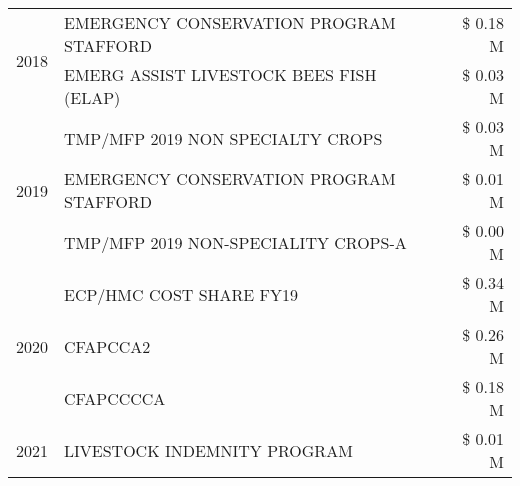 \begin{tabular}{llr}
\cline{1-3}
\multirow[t]{2}{*}{2018} & EMERGENCY CONSERVATION PROGRAM STAFFORD & \$ 0.18 M \\
 & EMERG ASSIST LIVESTOCK BEES FISH (ELAP) & \$ 0.03 M \\
\cline{1-3}
\multirow[t]{3}{*}{2019} & TMP/MFP 2019 NON SPECIALTY CROPS & \$ 0.03 M \\
 & EMERGENCY CONSERVATION PROGRAM STAFFORD & \$ 0.01 M \\
 & TMP/MFP 2019 NON-SPECIALITY CROPS-A & \$ 0.00 M \\
\cline{1-3}
\multirow[t]{3}{*}{2020} & ECP/HMC COST SHARE FY19 & \$ 0.34 M \\
 & CFAPCCA2 & \$ 0.26 M \\
 & CFAPCCCCA & \$ 0.18 M \\
\cline{1-3}
2021 & LIVESTOCK INDEMNITY PROGRAM & \$ 0.01 M \\
\cline{1-3}
\bottomrule
\end{tabular}
